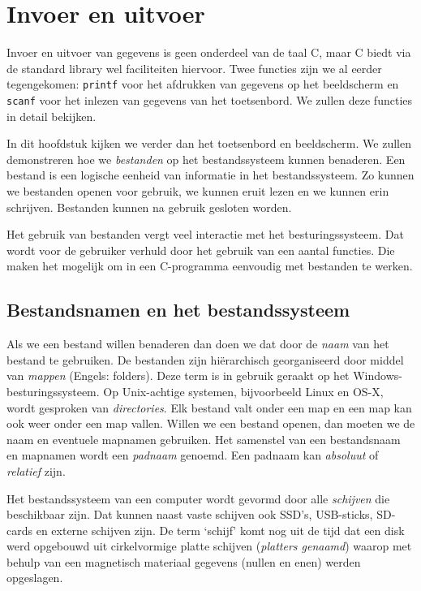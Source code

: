 \chapter{Invoer en uitvoer}
\label{cha:io}
\thispagestyle{empty}

Invoer en uitvoer van gegevens is geen onderdeel van de taal C, maar C biedt via de standard library wel faciliteiten hiervoor. Twee functies zijn we al eerder tegengekomen: \texttt{printf} voor het afdrukken van gegevens op het beeldscherm en \texttt{scanf} voor het inlezen van gegevens van het toetsenbord. We zullen deze functies in detail bekijken.

In dit hoofdstuk kijken we verder dan het toetsenbord en beeldscherm. We zullen demonstreren hoe we \textsl{bestanden} op het bestandssysteem kunnen benaderen. Een bestand is een logische eenheid van informatie in het bestandssysteem. Zo kunnen we bestanden openen voor gebruik, we kunnen eruit lezen en we kunnen erin schrijven. Bestanden kunnen na gebruik gesloten worden.

Het gebruik van bestanden vergt veel interactie met het besturingssysteem. Dat wordt voor de gebruiker verhuld door het gebruik van een aantal functies. Die maken het mogelijk om in een C-programma eenvoudig met bestanden te werken.


\section{Bestandsnamen en het bestandssysteem}
Als we een bestand willen benaderen dan doen we dat door de \textsl{naam} van het bestand te gebruiken. De bestanden zijn hiërarchisch georganiseerd door middel van \textsl{mappen} (Engels: folders). Deze term is in gebruik geraakt op het Windows-besturingssysteem. Op Unix-achtige systemen, bijvoorbeeld Linux en OS-X, wordt gesproken van \textsl{directories}. Elk bestand valt onder een map en een map kan ook weer onder een map vallen. Willen we een bestand openen, dan moeten we de naam en eventuele mapnamen gebruiken. Het samenstel van een bestandsnaam en mapnamen wordt een \textsl{padnaam} genoemd. Een padnaam kan \textsl{absoluut} of \textsl{relatief} zijn.

Het bestandssysteem van een computer wordt gevormd door alle \textsl{schijven} die beschikbaar zijn. Dat kunnen naast vaste schijven ook SSD's, USB-sticks, SD-cards en externe schijven zijn. De term `schijf' komt nog uit de tijd dat een disk werd opgebouwd uit cirkelvormige platte schijven (\textsl{platters genaamd}) waarop met behulp van een magnetisch materiaal gegevens (nullen en enen) werden opgeslagen.

